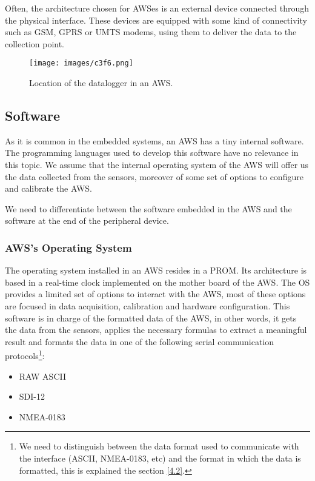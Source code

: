 {Often, the architecture chosen for \gls{AWS}es is an external device connected through the physical interface. These devices are equipped with some kind of connectivity such as \gls{GSM}, \gls{GPRS} or \gls{UMTS} modems, using them to deliver the data to the collection point. 

\begin{figure}[H]
\centerline{\texttt{[image: images/c3f6.png]}}
\caption{Location of the datalogger in an \protect \gls{AWS}.}
\end{figure}

\subsection{Software}

As it is common in the embedded systems, an \gls{AWS} has a tiny internal software. The programming languages used to develop this software have no relevance in this topic. We assume that the internal operating system of the \gls{AWS} will offer us the data collected from the sensors, moreover of some set of options to configure and calibrate the \gls{AWS}.  

We need to differentiate between the software embedded in the \gls{AWS} and the software at the end of the peripheral device. 

\subsubsection{AWS's Operating System}

The operating system installed in an \gls{AWS} resides in a \gls{PROM}. Its architecture is based in a real-time clock implemented on the mother board of the \gls{AWS}. The OS provides a limited set of options to interact with the \gls{AWS}, most of these options are focused in data acquisition, calibration and hardware configuration. This software is in charge of the formatted data of the \gls{AWS}, in other words, it gets the data from the sensors, applies the necessary formulas to extract a meaningful result and formats the data in one of the following serial communication protocols\footnote{We need to distinguish between the data format used to communicate with the interface (\gls{ASCII}, NMEA-0183, etc) and the format in which the data is formatted, this is explained the section \ref{4.2}.}:

\begin{itemize}
\item	RAW \gls{ASCII}
\item \gls{SDI-12}
\item \gls{NMEA-0183}
\end{itemize}

}
